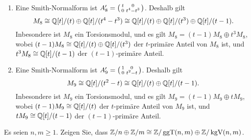 \begin{solution}
\begin{enumerate}
      \begin{enumerate}
        \item
          Eine Smith-Normalform ist $A_8' = \begin{psmallmatrix} t & 0 \\ 0 & t^4-t^3 \end{psmallmatrix}$.
          Deshalb gilt
          \[
                  M_8
            \cong \mathbb{Q}[t]/(t) \oplus \mathbb{Q}[t]/(t^4 - t^3)
            \cong \mathbb{Q}[t]/(t)  \oplus \mathbb{Q}[t]/(t^3) \oplus \mathbb{Q}[t]/(t-1).
          \]
          Inbesondere ist $M_8$ ein Torsionsmodul, und es gilt $M_8 = (t-1) M_8 \oplus t^3 M_8$, wobei $(t-1) M_8 \cong \mathbb{Q}[t]/(t) \oplus \mathbb{Q}[t]/(t^3)$ der $t$-primäre Anteil von $M_8$ ist, und $t^3 M_8 \cong \mathbb{Q}[t]/(t-1)$ der $(t-1)$-primäre Anteil.
        \item
          Eine Smith-Normalform ist $A_9' = \begin{psmallmatrix} 1 & 0 \\ 0 & t^2 - t \end{psmallmatrix}$.
          Deshalb gilt
          \[
                  M_9
            \cong \mathbb{Q}[t]/(t^2 - t)
            \cong \mathbb{Q}[t]/(t) \oplus \mathbb{Q}[t]/(t-1).
          \]
          Inbesondere ist $M_9$ ein Torsionsmodul, und es gilt $M_9 = (t-1) M_9 \oplus t M_9$, wobei $(t-1) M_9 \cong \mathbb{Q}[t]/(t)$ der $t$-primäre Anteil von $M_9$ ist, und $t M_9 \cong \mathbb{Q}[t]/(t-1)$ der $(t-1)$-primäre Anteil.
      \end{enumerate}
  \end{enumerate}
\end{solution}


\begin{question}[subtitle = Eine Isomorphie von abelschen Gruppen]
  Es seien $n, m \geq 1$.
  Zeigen Sie, dass $\mathbb{Z}/n \oplus \mathbb{Z}/m \cong \mathbb{Z}/\operatorname{ggT}(n,m) \oplus \mathbb{Z}/\operatorname{kgV}(n,m)$.
\end{question}



